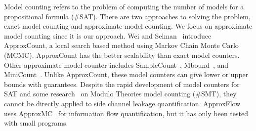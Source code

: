 Model counting refers to the problem of computing the number of
models for a propositional formula (\#SAT). There are two approaches to
solving the problem, exact model counting and approximate model
counting. We focus on approximate model counting since it is our approach. Wei and Selman~\cite{wei2005new} introduce
ApproxCount, a local search based method using Markov Chain Monte
Carlo (MCMC). ApproxCount has the better scalability than
exact model counters. Other approximate model counter includes
SampleCount~\cite{gomes2007sampling},
Mbound~\cite{gomes2006model}, and MiniCount~\cite{kroc2008leveraging}.
Unlike ApproxCount,
these model counters can give lower or upper bounds with guarantees.
Despite the rapid development of model counters for SAT and some
research~\cite{chistikov2017approximate,phan2015model} on Modulo Theories model counting (\#SMT),
they cannot be directly applied to
side channel leakage quantification.
ApproxFlow~\cite{biondi2018scalable} uses ApproxMC~\cite{chakraborty2016algorithmic} for information flow quantification,
but it has only been tested with small programs.
